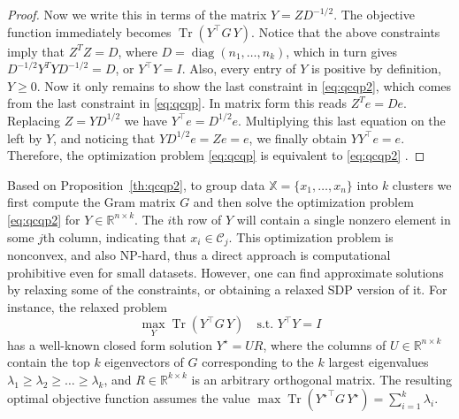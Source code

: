 \documentclass[aps,preprint,nofootinbib,floatfix]{revtex4-1}
\DeclareMathOperator{\diag}{diag}
\DeclareMathOperator{\Tr}{Tr}
\newcommand\C{{\mathcal{C}}}
\newcommand\Zt{Y}
\newcommand\e{e}
\begin{document}
\begin{proof}
Now we write this in terms of the matrix $Y = Z D^{-1/2}$.
The objective function immediately becomes
$\Tr\left( Y^\top G \, Y\right)$. Notice that the above constraints
imply that $Z^T Z = D$, where $D=\diag(n_1,\dotsc,n_k)$, which in turn gives
$D^{-1/2} Y^T Y D^{-1/2} = D$, or $Y^\top Y = I$. 
Also, every entry of $Y$ is positive by definition,
$Y \ge 0$. Now it only remains to show the last 
constraint in \eqref{eq:qcqp2}, which comes from the last
constraint in \eqref{eq:qcqp}. In matrix form this reads
$Z^T \e = D \e$. Replacing $Z=YD^{1/2}$ we have
$Y^\top \e = D^{1/2} \e$. Multiplying this last equation
on the left by $Y$, and noticing
that $Y D^{1/2} \e = Z \e = \e$, we finally obtain
$Y Y^\top \e = \e$. Therefore, the optimization 
problem \eqref{eq:qcqp} is equivalent
to \eqref{eq:qcqp2} .
\end{proof}

Based on Proposition~\ref{th:qcqp2}, to group data
$\mathbb{X} = \{ x_1,\dotsc,x_n \}$
into  $k$ clusters we first compute the Gram matrix
$G$ and then 
solve the optimization problem \eqref{eq:qcqp2} for $\Zt \in
\mathbb{R}^{n\times k}$. The $i$th row
of $\Zt$ will contain a single nonzero element in some $j$th column,
indicating that $x_i \in \C_j$. 
This optimization problem is nonconvex, and also NP-hard,
thus a direct approach 
is computational prohibitive even for small datasets.
However, one can find approximate solutions by relaxing some 
of the constraints, or obtaining a relaxed SDP version of it.
For instance, the relaxed problem
\begin{equation}
\label{eq:relaxed}
\max_{Y} \Tr \left( Y^\top G \, Y \right) \quad \mbox{s.t. $Y^\top Y = I$}
\end{equation}
has a well-known closed form solution $Y^\star = U R$, where the
columns of $U \in \mathbb{R}^{n\times k}$ 
contain the top $k$ eigenvectors of $G$ corresponding
to the $k$ largest eigenvalues $\lambda_1\ge \lambda_2\ge\dotsc\ge\lambda_k$, 
and
$R \in \mathbb{R}^{k\times k}$ is an arbitrary orthogonal matrix. 
The resulting
optimal objective function assumes the value 
$\max \Tr \left( {Y^\star}^\top G \, Y^\star \right)  = 
\sum_{i=1}^k \lambda_i$. 
\end{document}
